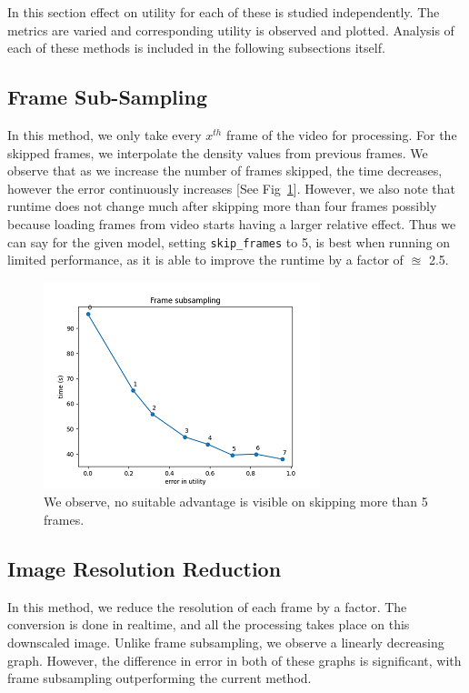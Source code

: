 \documentclass[conference]{IEEEtran}
\begin{document}
In this section effect on utility for each of these is studied independently. The metrics are varied and corresponding 
utility is observed and plotted. Analysis of each of these methods is included in the following subsections itself.

\subsection{Frame Sub-Sampling}

In this method, we only take every $x^{th}$ frame of the video for processing. For the skipped frames, we interpolate the density values from previous frames. We observe that as we increase the number of frames skipped, the time decreases, however the error continuously increases [See Fig~\ref{skf_evt}].
However, we also note that runtime does not change much after skipping more than four frames possibly because loading frames from video starts having a larger relative effect.
Thus we can say for the given model, setting \verb|skip_frames| to 5, is best 
when running on limited performance, as it is able to improve the runtime by a factor of $\approxeq$ 2.5.

\begin{figure}[htbp]
\centerline{\includegraphics{plots/plot_skip_frames.png}}
\caption{We observe, no suitable advantage is visible on skipping more than 5 frames.}
\label{skf_evt} 
\end{figure}


\subsection{Image Resolution Reduction}

In this method, we reduce the resolution of each frame by a factor. The conversion is done in realtime, and all the processing takes place on this downscaled image.
Unlike frame subsampling, we observe a linearly decreasing graph. However, the difference in error in both of these graphs is significant, with frame subsampling outperforming the current method.
\end{document}
